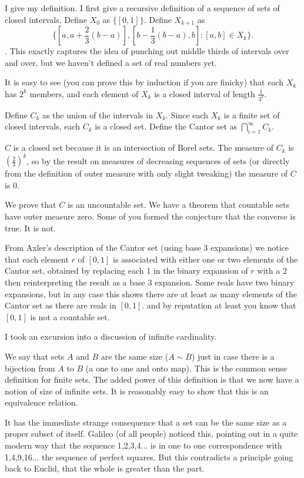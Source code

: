 \documentclass[12pt]{article}
\begin{document}
I give my definition.  I first give a recursive definition of a sequence of sets of closed intervals.  Define $X_0$ as $\{[0,1]\}$.  Define $X_{k+1}$ as $$\{[a,a+\frac23(b-a)],[b-\frac13(b-a),b]:[a,b]\in X_k\}.$$.  This exactly captures the idea of punching out middle thirds of intervals over and over, but we haven't defined a set of real numbers yet.

It is easy to see (you can prove this by induction if you are finicky) that each $X_k$ has $2^k$ members, and each element of $X_k$ is a closed interval of length $\frac1{3^k}$.

Define $C_k$ as the union of the intervals in $X_k$.  Since each $X_k$ is a finite set of closed intervals, each $C_k$ is a closed set.  Define the Cantor set as $\bigcap_{i=1}^\infty C_k$.

$C$ is a closed set because it is an intersection of Borel sets.  The measure of $C_k$ is $\left(\frac23\right)^k$, so by the result on measures of decreasing sequences of sets (or directly from the definition of outer measure with only slight tweaking) the measure of $C$ is 0.

We prove that $C$ is an uncountable set.  We have a theorem that countable sets have outer measure zero.  Some of you formed the conjecture that the converse is true.  It is not.

From Axler's description of the Cantor set (using base 3 expansions) we notice that each element $r$ of $[0,1]$ is associated with either one or two elements of the Cantor set, obtained by
replacing each 1 in the binary expansion of $r$ with a 2 then reinterpreting the result as a base 3 expansion.  Some reals have two binary expansions, but in any case this shows there are at least
as many elements of the Cantor set as there are reals in $[0,1]$. and by reputation at least you know that $[0,1]$ is not a countable set.

I took an excursion into a discussion of infinite cardinality.

We say that sets $A$ and $B$ are the same size ($A \sim B$) just in case there is a bijection from $A$ to $B$ (a one to one and onto map).  This is the common sense definition for finite sets.
The added power of this definition is that we now have a notion of size of infinite sets.  It is reasonably easy to show that this is an equivalence relation.

It has the immediate strange consequence that a set can be the same size as a proper subset of itself.  Galileo (of all people) noticed this, pointing out in a quite modern way that
the sequence 1,2,3,4...  is in one to one correspondence with 1,4,9,16... the sequence of perfect squares.  But this contradicts a principle going back to Euclid, that the whole is greater than the part.
\end{document}
